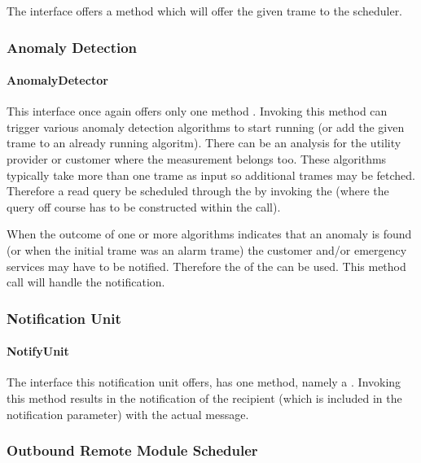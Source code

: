 \npar The  interface offers a
 method which will offer the given trame to the
scheduler.

\subsubsection{Anomaly Detection}

\paragraph{AnomalyDetector}

\npar This interface once again offers only one method .
Invoking this method can trigger various anomaly detection algorithms to start
running (or add the given trame to an already running algoritm). There can be an
analysis for the utility provider or customer where the measurement belongs too.
These algorithms typically take more than one trame as input so additional
trames may be fetched. Therefore a read query be scheduled through the
 by invoking the  (where
the query off course has to be constructed within the  call).

\npar When the outcome of one or more algorithms indicates that an anomaly is
found (or when the initial trame was an alarm trame) the customer and/or emergency
services may have to be notified. Therefore the 
of the  can be used. This method call will handle the
notification.

\subsubsection{Notification Unit}

\paragraph{NotifyUnit}

\npar The interface this notification unit offers, has one method, namely a
. Invoking this method results in the notification of
the recipient (which is included in the notification parameter) with the actual
message.

\subsubsection{Outbound Remote Module Scheduler}

